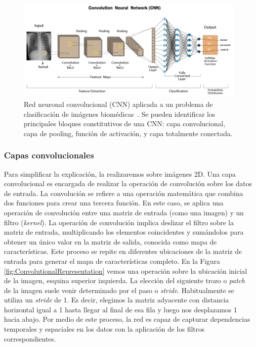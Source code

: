 \begin{figure}[htp]
  \centering
  \includegraphics[width=\textwidth]{imagenes/chapter2/RadiographyConvolutionExample.png}
  \caption[Ejemplo de red convolucional para imágenes médicas]{
    Red neuronal convolucional (CNN) aplicada a un problema de clasificación de imágenes biomédicas~\cite{RadiographyConvolutionExample}.
    Se pueden identificar los principales bloques constitutivos de una CNN: capa convolucional, 
    capa de pooling, función de activación, y capa totalmente conectada.
  }
  \label{fig:RadiographyConvolutionExample}
\end{figure}

\subsubsection{Capas convolucionales}
Para simplificar la explicación, la realizaremos sobre imágenes 2D. 
Una capa convolucional es encargada de realizar la operación de convolución sobre 
los datos de entrada. 
La convolución se refiere a una operación matemática que combina dos funciones para crear una tercera función.
En este caso, se aplica una operación de convolución 
entre una matriz de entrada (como una imagen) y un filtro (\emph{kernel}).
La operación de convolución implica deslizar el filtro sobre la matriz de entrada, 
multiplicando los elementos coincidentes y sumándolos para obtener un único valor 
en la matriz de salida, conocida como mapa de características. 
Este proceso se repite en diferentes ubicaciones de la matriz de 
entrada para generar el mapa de características completo. En la Figura 
\ref{fig:ConvolutionalRepresentation} vemos una operación sobre la ubicación 
inicial de la imagen, esquina superior izquierda. 
La elección del siguiente trozo 
o \emph{patch} de la imagen suele venir determinado por el paso o \emph{stride}.
Habitualmente se utiliza un \emph{stride} de 1. Es decir, elegimos la matriz 
adyacente con distancia horizontal igual a 1 hasta llegar al final de esa fila 
y luego nos desplazamos 1 hacia abajo. 
Por medio de este proceso, la red es capaz de
capturar dependencias temporales y espaciales en los datos con la aplicación
de los filtros correspondientes.

